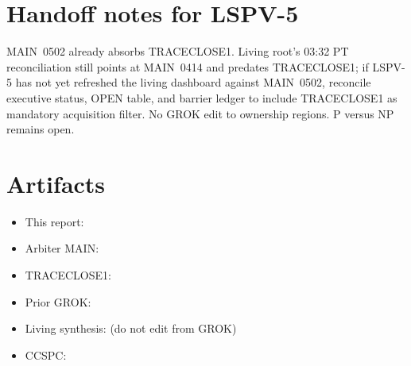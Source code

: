 \documentclass[11pt]{article}
\begin{document}
\section*{Handoff notes for LSPV-5}
MAIN~0502 already absorbs TRACECLOSE1. Living root's 03:32 PT reconciliation still points at
MAIN~0414 and predates TRACECLOSE1; if LSPV-5 has not yet refreshed the living dashboard against
MAIN~0502, reconcile executive status, OPEN table, and barrier ledger to include TRACECLOSE1 as
mandatory acquisition filter. No GROK edit to ownership regions. P versus NP remains open.

\section*{Artifacts}
\begin{itemize}
\item This report: 
\item Arbiter MAIN: 
\item TRACECLOSE1: 
\item Prior GROK: 
\item Living synthesis:  (do not edit from GROK)
\item CCSPC: 
\end{itemize}

\end{document}
